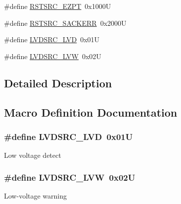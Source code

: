 \begin{DoxyCompactItemize}
\item 
\#define \hyperlink{group___p_e___const__module_ga83e04d23707e6e4f62d5d881277bb4e5}{R\+S\+T\+S\+R\+C\+\_\+\+E\+Z\+PT}~0x1000U
\item 
\#define \hyperlink{group___p_e___const__module_ga2bdec236f4f5002701b3672613078d95}{R\+S\+T\+S\+R\+C\+\_\+\+S\+A\+C\+K\+E\+RR}~0x2000U
\item 
\#define \hyperlink{group___p_e___const__module_gac31efdf3ba841e59289e3c11b5bf407c}{L\+V\+D\+S\+R\+C\+\_\+\+L\+VD}~0x01U
\item 
\#define \hyperlink{group___p_e___const__module_gafe8ffb97db9ede1045779df7d0eac3e4}{L\+V\+D\+S\+R\+C\+\_\+\+L\+VW}~0x02U
\end{DoxyCompactItemize}


\subsection{Detailed Description}


\subsection{Macro Definition Documentation}
\subsubsection[{\texorpdfstring{L\+V\+D\+S\+R\+C\+\_\+\+L\+VD}{LVDSRC_LVD}}]{\setlength{\rightskip}{0pt plus 5cm}\#define L\+V\+D\+S\+R\+C\+\_\+\+L\+VD~0x01U}\hypertarget{group___p_e___const__module_gac31efdf3ba841e59289e3c11b5bf407c}{}\label{group___p_e___const__module_gac31efdf3ba841e59289e3c11b5bf407c}
Low voltage detect 
\subsubsection[{\texorpdfstring{L\+V\+D\+S\+R\+C\+\_\+\+L\+VW}{LVDSRC_LVW}}]{\setlength{\rightskip}{0pt plus 5cm}\#define L\+V\+D\+S\+R\+C\+\_\+\+L\+VW~0x02U}\hypertarget{group___p_e___const__module_gafe8ffb97db9ede1045779df7d0eac3e4}{}\label{group___p_e___const__module_gafe8ffb97db9ede1045779df7d0eac3e4}
Low-\/voltage warning 
